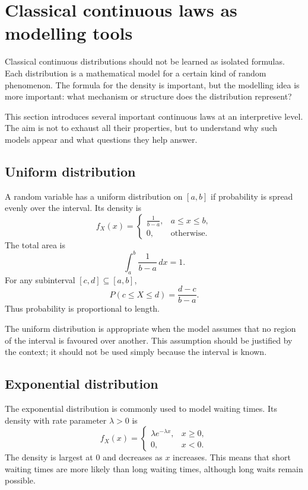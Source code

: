 \section{Classical continuous laws as modelling tools}

Classical continuous distributions should not be learned as isolated formulas.
Each distribution is a mathematical model for a certain kind of random
phenomenon. The formula for the density is important, but the modelling idea is
more important: what mechanism or structure does the distribution represent?

This section introduces several important continuous laws at an interpretive
level. The aim is not to exhaust all their properties, but to understand why such
models appear and what questions they help answer.

\subsection*{Uniform distribution}

A random variable has a uniform distribution on \([a,b]\) if probability is spread
evenly over the interval. Its density is
\[
f_X(x)=
\begin{cases}
\frac1{b-a}, & a\leq x\leq b,\\
0, & \text{otherwise}.
\end{cases}
\]
The total area is
\[
\int_a^b\frac1{b-a}\,dx=1.
\]
For any subinterval \([c,d]\subseteq[a,b]\),
\[
P(c\leq X\leq d)=\frac{d-c}{b-a}.
\]
Thus probability is proportional to length.

The uniform distribution is appropriate when the model assumes that no region of
the interval is favoured over another. This assumption should be justified by the
context; it should not be used simply because the interval is known.

\subsection*{Exponential distribution}

The exponential distribution is commonly used to model waiting times. Its density
with rate parameter \(\lambda>0\) is
\[
f_X(x)=
\begin{cases}
\lambda e^{-\lambda x}, & x\geq0,\\
0, & x<0.
\end{cases}
\]
The density is largest at \(0\) and decreases as \(x\) increases. This means that
short waiting times are more likely than long waiting times, although long waits
remain possible.

